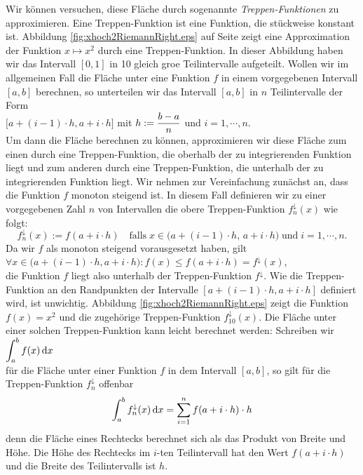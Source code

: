 Wir k\"onnen versuchen, diese Fl\"ache durch sogenannte
\emph{Treppen-Funktionen} zu approximieren.  Eine Treppen-Funktion ist eine Funktion, die
st\"uckweise konstant ist.  Abbildung \ref{fig:xhoch2RiemannRight.eps} auf Seite 
\pageref{fig:xhoch2RiemannRight.eps} zeigt eine Approximation der Funktion $x \mapsto x^2$
durch eine Treppen-Funktion.  In dieser Abbildung haben wir das Intervall $[0,1]$ in 10 gleich
gro\3e Teilintervalle aufgeteilt.  Wollen wir im allgemeinen Fall die Fl\"ache unter eine
Funktion $f$ in einem vorgegebenen Intervall $[a,b]$ berechnen, so 
unterteilen wir das Intervall $[a,b]$ in $n$ Teilintervalle der Form 
\\[0.2cm]
\hspace*{1.3cm}
$\bigl[a + (i-1) \cdot  h, a + i\cdot h \bigr]$ \quad mit $\displaystyle h := \frac{b-a}{n}$ und $i=1,\cdots,n$.
\\[0.2cm]
Um dann die Fl\"ache berechnen zu k\"onnen, approximieren wir diese Fl\"ache
zum einen durch eine Treppen-Funktion, die oberhalb der zu integrierenden Funktion liegt und zum anderen durch eine
Treppen-Funktion, die unterhalb der zu integrierenden Funktion liegt.  Wir nehmen zur
Vereinfachung zun\"achst an, dass die Funktion $f$ monoton steigend ist.
In diesem Fall definieren wir zu einer vorgegebenen Zahl $n$ von Intervallen die obere
Treppen-Funktion $f^\downarrow_{n}(x)$ wie folgt:
\begin{equation}
  \label{eq:treppeOben}
  f^\downarrow_n(x) := f(a + i\cdot h) \quad \mbox{falls}\; 
  x \in  \bigl(a+(i-1)\cdot h,\, a+i\cdot h\bigr)\;\mbox{und}\;i=1,\cdots,n.
\end{equation}
Da wir $f$ als monoton steigend vorausgesetzt haben, gilt 
\\[0.2cm]
\hspace*{1.3cm}
$\forall x \in \bigl( a+(i-1)\cdot h, a+i\cdot h\bigr): f(x) \leq f(a+i\cdot h) = f^\downarrow(x)$,
\\[0.2cm]
die Funktion $f$ liegt also unterhalb der Treppen-Funktion $f^\downarrow$.
Wie die Treppen-Funktion an den Randpunkten der Intervalle $[a+(i-1)\cdot h, a+i\cdot h]$ definiert
wird, ist unwichtig.  Abbildung \ref{fig:xhoch2RiemannRight.eps} zeigt die Funktion 
$f(x) = x^2$ und die zugeh\"orige Treppen-Funktion $f^\downarrow_{10}(x)$.  Die Fl\"ache unter
einer solchen Treppen-Funktion kann leicht berechnet werden:  Schreiben wir
\\[0.2cm]
\hspace*{1.3cm}
$\displaystyle \int_a^b f(x) \,\textrm{d} x$
\\[0.2cm] 
f\"ur die Fl\"ache unter einer Funktion $f$ in dem Intervall $[a,b]$, so gilt f\"ur die
Treppen-Funktion $f^\downarrow_{n}$ offenbar
\begin{equation}
  \label{eq:intOber}
  \int_a^b f^\downarrow_n(x) \,\textrm{d} x = \sum\limits_{i=1}^n f(a+i\cdot h)\cdot h
\end{equation}
denn die Fl\"ache eines Rechtecks berechnet sich als das Produkt von Breite und H\"ohe.  Die
H\"ohe des Rechtecks im $i$-ten Teilintervall hat den Wert $f(a + i\cdot h)$ und die Breite
des Teilintervalls ist $h$.

